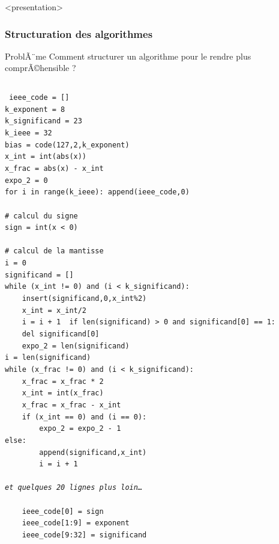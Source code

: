 \begin{frame}<presentation>
\frametitle{Structuration des algorithmes}
\begin{block}{ProblÃ¨me}
Comment structurer un algorithme pour le rendre plus comprÃ©hensible ?
\end{block}
\pause
\begin{columns}[T]
\column{5.5cm}\tiny\tt
    ieee\_code = []\\
    k\_exponent = 8\\
    k\_significand = 23\\
    k\_ieee = 32\\
    bias = code(127,2,k\_exponent)\\
    x\_int = int(abs(x))\\
    x\_frac = abs(x) - x\_int\\
    expo\_2 = 0\\
    for i in range(k\_ieee): append(ieee\_code,0)\\
\mbox{}\\
    \# calcul du signe\\
    sign = int(x < 0)\\
\mbox{}\\ 
    \# calcul de la mantisse\\
    i = 0\\
    significand = []\\
    while (x\_int != 0) and (i < k\_significand):\\
\ \ \ \ insert(significand,0,x\_int\%2)\\
\ \ \ \ x\_int = x\_int/2\\
\ \ \ \ i = i + 1
\column{5.5cm}\tiny\tt
    if len(significand) > 0 and significand[0] == 1:\\
\ \ \ \ del significand[0]\\
\ \ \ \ expo\_2 = len(significand)\\
    i = len(significand)\\
    while (x\_frac != 0) and (i < k\_significand):\\
\ \ \ \ x\_frac = x\_frac * 2\\
\ \ \ \ x\_int = int(x\_frac)\\
\ \ \ \ x\_frac = x\_frac - x\_int\\
\ \ \ \ if (x\_int == 0) and (i == 0):\\
\ \ \ \ \ \ \ \ expo\_2 = expo\_2 - 1\\
        else:\\
\ \ \ \ \ \ \ \ append(significand,x\_int)\\
\ \ \ \ \ \ \ \ i = i + 1\\
\mbox{}\\
\pause
\alert{\em et quelques 20 lignes plus loin\ldots}\\
\mbox{}\\
\ \ \ \ ieee\_code[0] = sign\\
\ \ \ \ ieee\_code[1:9] = exponent\\
\ \ \ \ ieee\_code[9:32] = significand	    
\end{columns}
\end{frame}
\note{}

